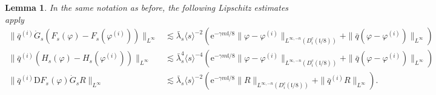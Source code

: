 \documentclass[11pt, a4paper]{scrartcl}
\numberwithin{equation}{section}
\theoremstyle{plain}
\newtheorem{lemma}[foo]{Lemma}
\theoremstyle{remark}
\newcommand{\mathD}{\mathrm{D}}
\newcommand{\mathe}{\mathrm{e}}
\newcommand{\nosymbol}{}
\begin{document}
\begin{lemma}
	\label{lem:Lip-corr}In the same notation as before, the following Lipschitz
	estimates apply
		{\footnotesize
			\begin{align}
				\| \bar{q}^{(i)}  \dot{G}_s (F_s (\varphi) - F_s (\varphi^{(i)}))
				\|_{L^{\infty}}                                                        & \lesssim  \bar{\lambda}_s \langle s \rangle^{- 2} (\mathe^{-
					\gamma m\mathfrak{l}/ 8}  \| \varphi - \varphi^{(i)} \|_{L^{\infty, - n}
						(D_i^c (\mathfrak{l}/ 8))} + \| \bar{q} (\varphi - \varphi^{(i)})
				\|_{L^{\infty}}) \label{eq:fwd-est}                                                                                                   \\
				\| \bar{q}^{(i)} (H_s (\varphi) - H_s (\varphi^{(i)})) \|_{L^{\infty}} &
				\lesssim \bar{\lambda}^4_s \langle s \rangle^{- 4} (\mathe^{- \gamma
					m\mathfrak{l}/ 8}  \| \varphi - \varphi^{(i)} \|_{L^{\infty, - n} (D_i^c
						(\mathfrak{l}/ 8))} + \| \bar{q} (\varphi - \varphi^{(i)})
				\|_{L^{\infty}}) \label{eq:H-est}                                                                                                     \\
				\| \bar{q}^{(i)} \mathD F_s (\varphi)  \dot{G}_s R \|_{\nosymbol
				L^{\infty}}                                                            & \lesssim  \bar{\lambda}_s \langle s \rangle^{- 2} (\mathe^{-
					\gamma m\mathfrak{l}/ 8} \| R \|_{L^{\infty, - n} (D_i^c (\mathfrak{l}/
						8))} + \| \bar{q}^{(i)} R \|_{L^{\infty}}) \label{eq:bwd-est} .
			\end{align}}
\end{lemma}
\end{document}
